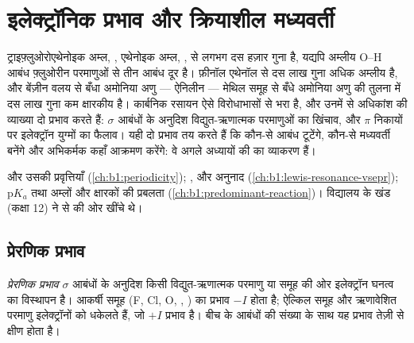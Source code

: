 \chapter{इलेक्ट्रॉनिक प्रभाव और क्रियाशील मध्यवर्ती}\label{ch:b1:electronic-effects}

ट्राइफ़्लुओरोएथेनोइक अम्ल, , एथेनोइक अम्ल, , से लगभग दस हज़ार गुना
 है, यद्यपि अम्लीय
O--H आबंध फ़्लुओरीन परमाणुओं से तीन आबंध दूर है। फ़ीनॉल
एथेनॉल से दस लाख गुना अधिक अम्लीय है, और बेंज़ीन वलय से बँधा अमोनिया अणु
--- ऐनिलीन --- मेथिल समूह से बँधे अमोनिया अणु की तुलना में दस लाख गुना कम क्षारकीय है।
कार्बनिक रसायन ऐसे विरोधाभासों से भरा है, और
उनमें से अधिकांश की व्याख्या दो प्रभाव करते हैं: $\sigma$ आबंधों के अनुदिश
विद्युत-ऋणात्मक परमाणुओं का खिंचाव, और $\pi$
निकायों पर इलेक्ट्रॉन युग्मों का फैलाव। यही दो प्रभाव तय करते हैं कि कौन-से आबंध टूटेंगे, कौन-से
मध्यवर्ती बनेंगे और अभिकर्मक कहाँ आक्रमण करेंगे: वे अगले अध्यायों की
 का व्याकरण हैं।

\begin{recall}
 और उसकी प्रवृत्तियाँ (\cref{ch:b1:periodicity}); ,  और अनुनाद (\cref{ch:b1:lewis-resonance-vsepr});
$\mathrm{p}K_a$ तथा अम्लों और क्षारकों की प्रबलता
(\cref{ch:b1:predominant-reaction})। विद्यालय के खंड (कक्षा 12) ने
 से  की ओर  खींचे थे।
\end{recall}

\section{प्रेरणिक प्रभाव}

\begin{definition}[प्रेरणिक प्रभाव]\label{def:b1:electronic-effects:inductive}
\emph{प्रेरणिक प्रभाव} $\sigma$ आबंधों के अनुदिश किसी
विद्युत-ऋणात्मक परमाणु या समूह की ओर इलेक्ट्रॉन घनत्व का विस्थापन है।
आकर्षी समूह (F, Cl, O, , ) का प्रभाव $-I$ होता है;
ऐल्किल समूह और ऋणावेशित परमाणु इलेक्ट्रॉनों को धकेलते हैं, जो $+I$
प्रभाव है। बीच के आबंधों की संख्या के साथ यह प्रभाव तेज़ी से क्षीण होता है।
\end{definition}


